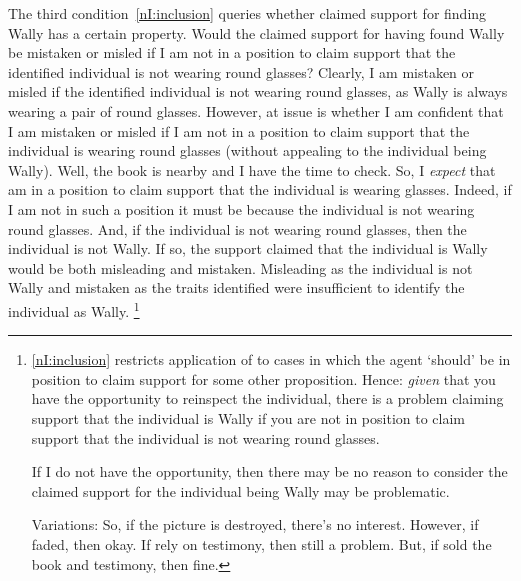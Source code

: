 \begin{note}[Illustration]
  The third condition~\ref{nI:inclusion} queries whether claimed support for finding Wally has a certain property.
  Would the claimed support for having found Wally be mistaken or misled if I am not in a position to claim support that the identified individual is not wearing round glasses?
  Clearly, I am mistaken or misled if the identified individual is not wearing round glasses, as Wally is always wearing a pair of round glasses.
  However, at issue is whether I am confident that I am mistaken or misled if I am not in a position to claim support that the individual is wearing round glasses (without appealing to the individual being Wally).
  Well, the book is nearby and I have the time to check.
  So, I \emph{expect} that am in a position to claim support that the individual is wearing glasses.
  Indeed, if I am not in such a position it must be because the individual is not wearing round glasses.
  And, if the individual is not wearing round glasses, then the individual is not Wally.
  If so, the support claimed that the individual is Wally would be both misleading and mistaken.
  Misleading as the individual is not Wally and mistaken as the traits identified were insufficient to identify the individual as Wally.\nolinebreak
  \footnote{
    \ref{nI:inclusion} restricts application of \nI{} to cases in which the agent `should' be in position to claim support for some other proposition.
    Hence: \emph{given} that you have the opportunity to reinspect the individual, there is a problem claiming support that the individual is Wally if you are not in position to claim support that the individual is not wearing round glasses.

    If I do not have the opportunity, then there may be no reason to consider the claimed support for the individual being Wally may be problematic.

    Variations:
    So, if the picture is destroyed, there's no interest.
    However, if faded, then okay.
    If rely on testimony, then still a problem.
    But, if sold the book and testimony, then fine.
  }


\end{note}
